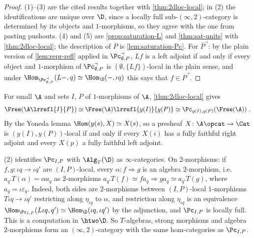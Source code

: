 \begin{proof}
(1)--(3) are the cited results together with \cref{thm:2dloc-local}; in (2) the identifications are unique over $\D$, since a locally full sub-$(\infty,2)$-category is determined by its objects and $1$-morphisms, so they agree with the one from pasting pushouts.
(4) and (5) are \cref{prop:saturation-L} and \cref{thm:sat-units} with \cref{thm:2dloc-local}; the description of $\overline{P}$ is \cref{lem:saturation-Pc}. For $\overline{P}^{\dashv}$: by the plain version of \cref{lem:repr-refl} applied in $\Pc^{\dashv}_{\emptyset,P}$, $Lf$ is a left adjoint if and only if every object and $1$-morphism of $\Pc^{\dashv}_{\emptyset,P}$ is $(\emptyset,\{Lf\})$-local in the plain sense, and under $\Hom_{\Pc^{\dashv}_{\emptyset,P}}(L-,q) \simeq \Hom_{\D}(-,\iota q)$ this says that $f \in \overline{P}^{\dashv}$.
\end{proof}

\begin{rmk}
\label{rmk:free-local}
For small $\A$ and sets $I$, $P$ of $1$-morphisms of $\A$, \cref{thm:2dloc-local} gives
\[
\Free(\A\lrrefl{I}{P}) \simeq \Free(\A)\lrrefl{y(I)}{y(P)} \simeq \Pc_{y(I),y(P)}(\Free(\A)) \ .
\] By the Yoneda lemma $\Hom(y(s),X) \simeq X(s)$, so a presheaf $X\colon \A\opcat \to \Cat$ is $(y(I),y(P))$-local if and only if every $X(i)$ has a fully faithful right adjoint and every $X(p)$ a fully faithful left adjoint.
\end{rmk}

\begin{rmk}
\label{rmk:eilenberg-moore-enriched}
(2) identifies $\Pc_{I,P}$ with $\Alg_{T}(\D)$ as $\infty$-categories. On $2$-morphisms: if $f,g\colon \iota q \to \iota q'$ are $(I,P)$-local, every $\alpha\colon f \Rightarrow g$ is an algebra $2$-morphism, i.e.\ $a_{q'}T(\alpha) = \alpha a_{q}$ as $2$-morphisms $a_{q'}T(f) \simeq fa_{q} \Rightarrow ga_{q} \simeq a_{q'}T(g)$, where $a_{q} = \iota\varepsilon_{q}$. Indeed, both sides are $2$-morphisms between $(I,P)$-local $1$-morphisms $T\iota q \to \iota q'$ restricting along $\eta_{\iota q}$ to $\alpha$, and restriction along $\eta_{\iota q}$ is an equivalence $\Hom_{\Pc_{I,P}}(L\iota q,q') \simeq \Hom_{\D}(\iota q,\iota q')$ by the adjunction, and $\Pc_{I,P}$ is locally full. This is a computation in $\htwo\D$. So $T$-algebras, strong morphisms and algebra $2$-morphisms form an $(\infty,2)$-category with the same hom-categories as $\Pc_{I,P}$.
\end{rmk}


